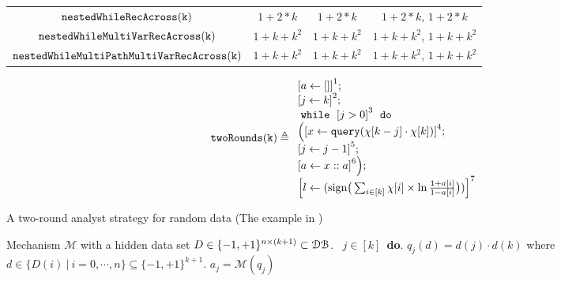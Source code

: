 {\begin{center}
\begin{tabular}{ c c c c}
         $ \mathtt{nestedWhileRecAcross(k)}$ & $1 + 2*k$ & $1 + 2*k$ & $1 + 2*k$, $1 + 2*k$   \\
         $ \mathtt{nestedWhileMultiVarRecAcross(k)}$ & $1 + k + k^2$ & $1 + k + k^2$  & $1 + k + k^2$,  $1 + k + k^2$  \\
         $ \mathtt{nestedWhileMultiPathMultiVarRecAcross(k)}$ & $1 + k + k^2$ & $1 + k + k^2$  & $1 + k + k^2$,  $1 + k + k^2$  \\
        \end{tabular}
      \end{center}
}  
    \begin{example}
        \[
            \kw{twoRounds(k)} \triangleq
        \begin{array}{l}
               \clabel{ a \leftarrow []}^{1} ; \\
                \clabel{\assign{j}{k} }^{2} ; \\
                \ewhile ~ \clabel{j > 0}^{3} ~ \edo ~ \\
                \Big(
                 \clabel{\assign{x}{\query(\chi[k - j]\cdot \chi[k])} }^{4}  ; \\
                 \clabel{\assign{j}{j-1}}^{5} ;\\
                \clabel{a \leftarrow x :: a}^{6}       \Big);\\
                \clabel{l \leftarrow (\mathrm{sign}\big (\sum_{i\in [k]} \chi[i]\times\ln\frac{1+a[i]}{1-a[i]} \big ))}^{7}\\
            \end{array}
        \]
        \begin{algorithm}
        \footnotesize
        \caption{A two-round analyst strategy for random data (The example in  \cite{dwork2015generalization})}
        \label{alg:twoRound}
        \begin{algorithmic}
        \REQUIRE Mechanism $\mathcal{M}$ with a hidden data set $D \in \{-1,+1\}^{n\times (k+1)} \subset \mathcal{DB}$.
        \ $j\in [k]$\ {\bf do}.  
        \STATE {} $q_j(d)=d(j)\cdot d(k)$ where $d \in \{D(i) ~|~ i = 0, \cdots, n\} \subseteq \{-1,+1\}^{k+1}$.
        \STATE {} $a_j=\mathcal{M}(q_j)$ 
        \STATE \qquad {}

\end{algorithmic}
\end{algorithm}
\end{example}
